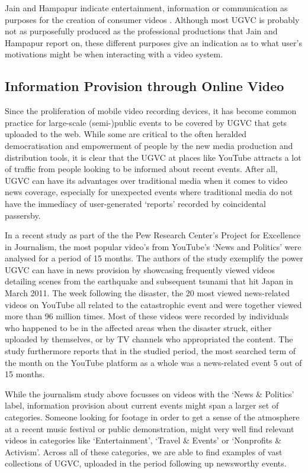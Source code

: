 Jain and Hampapur indicate entertainment, information or communication as purposes for the creation of consumer videos \cite{Jain:1994we}. Although most UGVC is probably not as purposefully produced as the professional productions that Jain and Hampapur report on, these different purposes give an indication as to what user's motivations might be when interacting with a video system.

\subsection{Information Provision through Online Video}

Since the proliferation of mobile video recording devices, it has become common practice for large-scale (semi-)public events to be covered by UGVC that gets uploaded to the web. While some are critical\cite{Jonsson:2011fh} to the often heralded democratisation and empowerment of people by the new media production and distribution tools, it is clear that the UGVC at places like YouTube attracts a lot of traffic from people looking to be informed about recent events. After all, UGVC can have its advantages over traditional media when it comes to video news coverage, especially for unexpected events where traditional media do not have the immediacy of user-generated `reports' recorded by coincidental passersby. 

In a recent study as part of the the Pew Research Center’s Project for Excellence in Journalism, the most popular video's from YouTube's `News and Politics' were analysed for a period of 15 months\cite{Rosenstiel:2012vb}. The authors of the study exemplify the power UGVC can have in news provision by showcasing frequently viewed videos detailing scenes from the earthquake and subsequent tsunami that hit Japan in March 2011. The week following the disaster, the 20 most viewed news-related videos on YouTube all related to the catastrophic event and were together viewed more than 96 million times. Most of these videos were recorded by individuals who happened to be in the affected areas when the disaster struck, either uploaded by themselves, or by TV channels who appropriated the content. The study furthermore reports that in the studied period, the most searched term of the month on the YouTube platform as a whole was a news-related event 5 out of 15 months.

While the journalism study above focusses on videos with the `News \& Politics' label, information provision about current events might span a larger set of categories. Someone looking for footage in order to get a sense of the atmosphere at a recent music festival or public demonstration, might very well find relevant videos in categories like `Entertainment', `Travel \& Events' or `Nonprofits \& Activism'. Across all of these categories, we are able to find examples of vast collections of UGVC, uploaded in the period following up newsworthy events.

